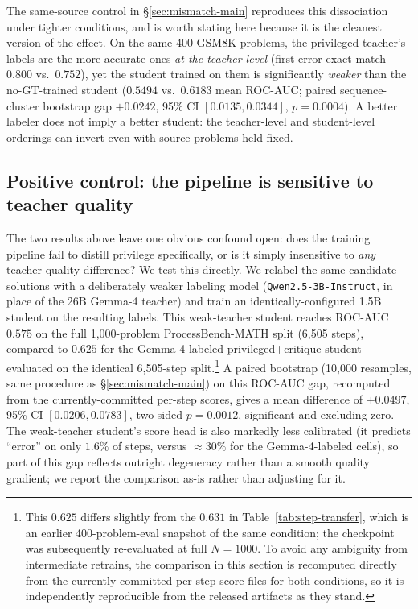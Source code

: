 \documentclass{article}
\begin{document}
The same-source control in \S\ref{sec:mismatch-main} reproduces this
dissociation under tighter conditions, and is worth stating here because it
is the cleanest version of the effect. On the same 400 GSM8K problems, the
privileged teacher's labels are the more accurate ones \emph{at the teacher
level} (first-error exact match $0.800$ vs.\ $0.752$), yet the student trained
on them is significantly \emph{weaker} than the no-GT-trained student
($0.5494$ vs.\ $0.6183$ mean ROC-AUC; paired sequence-cluster bootstrap gap
$+0.0242$, 95\% CI $[0.0135, 0.0344]$, $p=0.0004$). A better labeler does not
imply a better student: the teacher-level and student-level orderings can
invert even with source problems held fixed.

\subsection{Positive control: the pipeline is sensitive to teacher quality}
\label{sec:positive-control}
The two results above leave one obvious confound open: does the training
pipeline fail to distill privilege specifically, or is it simply
insensitive to \emph{any} teacher-quality difference? We test this directly.
We relabel the same candidate solutions with a deliberately weaker labeling
model (\texttt{Qwen2.5-3B-Instruct}, in place of the 26B Gemma-4 teacher)
and train an identically-configured 1.5B student on the resulting labels.
This weak-teacher student reaches ROC-AUC $0.575$ on the full 1{,}000-problem
ProcessBench-MATH split (6{,}505 steps), compared to $0.625$ for the
Gemma-4-labeled privileged+critique student evaluated on the identical
6{,}505-step split.\footnote{This $0.625$ differs slightly from the $0.631$
in Table~\ref{tab:step-transfer}, which is an earlier 400-problem-eval
snapshot of the same condition; the checkpoint was subsequently re-evaluated
at full $N{=}1000$. To avoid any ambiguity from intermediate retrains, the
comparison in this section is recomputed directly from the currently-committed
per-step score files for both conditions, so it is independently reproducible
from the released artifacts as they stand.} A paired bootstrap
(10{,}000 resamples, same procedure as \S\ref{sec:mismatch-main}) on this
ROC-AUC gap, recomputed from the currently-committed per-step scores, gives
a mean difference of $+0.0497$, 95\% CI $[0.0206, 0.0783]$, two-sided
$p=0.0012$, significant and excluding zero. The weak-teacher student's score
head is also markedly
less calibrated (it predicts ``error'' on only $1.6\%$ of steps, versus
$\approx 30\%$ for the Gemma-4-labeled cells), so part of this gap reflects
outright degeneracy rather than a smooth quality gradient; we report the
comparison as-is rather than adjusting for it.
\end{document}
